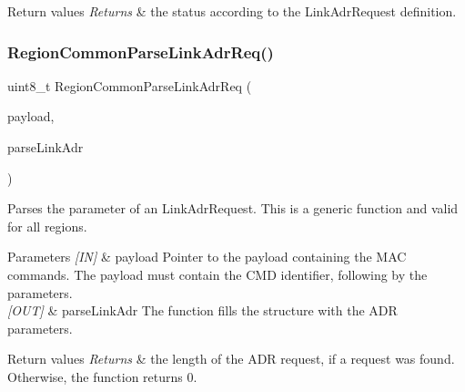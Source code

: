 \begin{DoxyRetVals}{Return values}
{\em Returns} & the status according to the Link\+Adr\+Request definition. \\
\hline
\end{DoxyRetVals}
\mbox{\label{group__REGIONCOMMON_ga8403c78482dbb901014dba48b75d78e8}} 
\subsubsection{\texorpdfstring{Region\+Common\+Parse\+Link\+Adr\+Req()}{RegionCommonParseLinkAdrReq()}}
{\footnotesize\ttfamily uint8\+\_\+t Region\+Common\+Parse\+Link\+Adr\+Req (\begin{DoxyParamCaption}\item[{uint8\+\_\+t $\ast$}]{payload,  }\item[{\hyperlink{group__REGIONCOMMON_ga6e1aaa6b8d179e2daffac8d1e23d7f24}{Region\+Common\+Link\+Adr\+Params\+\_\+t} $\ast$}]{parse\+Link\+Adr }\end{DoxyParamCaption})}



Parses the parameter of an Link\+Adr\+Request. This is a generic function and valid for all regions. 


\begin{DoxyParams}{Parameters}
{\em \mbox{[}\+I\+N\mbox{]}} & payload Pointer to the payload containing the M\+AC commands. The payload must contain the C\+MD identifier, following by the parameters.\\
\hline
{\em \mbox{[}\+O\+U\+T\mbox{]}} & parse\+Link\+Adr The function fills the structure with the A\+DR parameters.\\
\hline
\end{DoxyParams}

\begin{DoxyRetVals}{Return values}
{\em Returns} & the length of the A\+DR request, if a request was found. Otherwise, the function returns 0. \\
\hline
\end{DoxyRetVals}
\mbox{\label{group__REGIONCOMMON_ga491dea5590228a0cd33affd71743779c}} 

